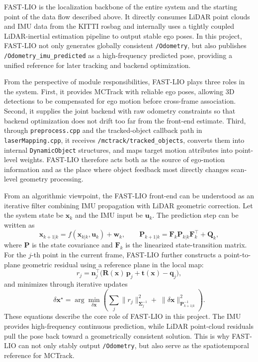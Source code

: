 \documentclass[a4paper,12pt]{article}
\newcommand{\code}[1]{\nolinkurl{#1}}
\begin{document}
FAST-LIO is the localization backbone of the entire system and the starting point of the data flow described above. It directly consumes LiDAR point clouds and IMU data from the KITTI rosbag and internally uses a tightly coupled LiDAR-inertial estimation pipeline to output stable ego poses. In this project, FAST-LIO not only generates globally consistent \code{/Odometry}, but also publishes \code{/Odometry_imu_predicted} as a high-frequency predicted pose, providing a unified reference for later tracking and backend optimization.

From the perspective of module responsibilities, FAST-LIO plays three roles in the system. First, it provides MCTrack with reliable ego poses, allowing 3D detections to be compensated for ego motion before cross-frame association. Second, it supplies the joint backend with raw odometry constraints so that backend optimization does not drift too far from the front-end estimate. Third, through \code{preprocess.cpp} and the tracked-object callback path in \code{laserMapping.cpp}, it receives \code{/mctrack/tracked_objects}, converts them into internal \texttt{DynamicObject} structures, and maps target motion attributes into point-level weights. FAST-LIO therefore acts both as the source of ego-motion information and as the place where object feedback most directly changes scan-level geometry processing.

From an algorithmic viewpoint, the FAST-LIO front-end can be understood as an iterative filter combining IMU propagation with LiDAR geometric correction. Let the system state be \(\mathbf{x}_k\) and the IMU input be \(\mathbf{u}_k\). The prediction step can be written as
\begin{equation}
\mathbf{x}_{k+1|k}=f(\mathbf{x}_{k|k}, \mathbf{u}_k)+\mathbf{w}_k,
\qquad
\mathbf{P}_{k+1|k}=\mathbf{F}_k \mathbf{P}_{k|k}\mathbf{F}_k^\top+\mathbf{Q}_k,
\end{equation}
where \(\mathbf{P}\) is the state covariance and \(\mathbf{F}_k\) is the linearized state-transition matrix. For the \(j\)-th point in the current frame, FAST-LIO further constructs a point-to-plane geometric residual using a reference plane in the local map:
\begin{equation}
r_j=\mathbf{n}_j^\top\!\bigl(\mathbf{R}(\mathbf{x})\,\mathbf{p}_j+\mathbf{t}(\mathbf{x})-\mathbf{q}_j\bigr),
\end{equation}
and minimizes through iterative updates
\begin{equation}
\delta \mathbf{x}^{\star}
=
\arg\min_{\delta \mathbf{x}}
\left(
\sum_{j} \|r_j\|^2_{\mathbf{\Sigma}_j^{-1}}
+\;
\|\delta \mathbf{x}\|^2_{\mathbf{P}_{k+1|k}^{-1}}
\right).
\end{equation}
These equations describe the core role of FAST-LIO in this project. The IMU provides high-frequency continuous prediction, while LiDAR point-cloud residuals pull the pose back toward a geometrically consistent solution. This is why FAST-LIO can not only stably output \code{/Odometry}, but also serve as the spatiotemporal reference for MCTrack.
\end{document}
